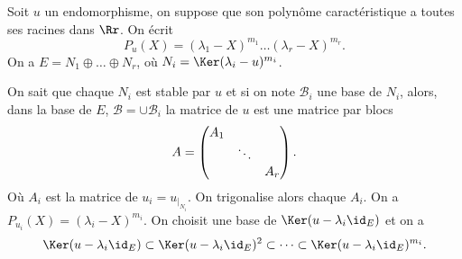 \documentclass[class=report,crop=false]{standalone}
\begin{document}
Soit $u$ un endomorphisme, on suppose que son polynôme caractéristique a toutes ses racines dans $\Rr$. On écrit
$$P_u(X)=(\lambda_1-X)^{m_1}\dots(\lambda_r-X)^{m_r}.$$
On a $E=N_1\oplus\dots\oplus N_r$, où $N_i=\Ker(\lambda_i-u)^{m_i}$.

On sait que chaque $N_i$ est stable par $u$ et si on note $\mathcal{B}_i$ une base de $N_i$, alors, dans la base de $E$, $\mathcal{B}=\cup\mathcal{B}_i$ la matrice de $u$ est une matrice par blocs
$$A=\left(\begin{matrix}A_1&\ &\ \cr\ &\ddots&\ \cr\ &\ &A_r\end{matrix}\right).$$
 Où $A_i$ est la matrice de $u_i=u_{|_{N_i}}$. On trigonalise alors chaque $A_i$.
 On a $P_{u_i}(X)=(\lambda_i-X)^{m_i}$. On choisit une base de $\Ker(u-\lambda_i\id_E)$ et on a
 $$\Ker(u-\lambda_i\id_E)\subset\Ker(u-\lambda_i\id_E)^2\subset\cdots\subset\Ker(u-\lambda_i\id_E)^{m_i}.$$
\end{document}
